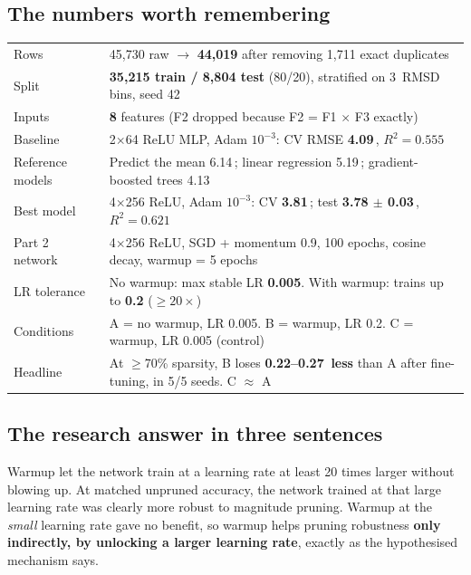 \documentclass[11pt,a4paper]{article}
\newcommand{\A}{\,\text{\AA}}
\begin{document}
\subsection*{The numbers worth remembering}
\begin{tabularx}{\linewidth}{@{}lY@{}}
\toprule
Rows & 45{,}730 raw $\to$ \textbf{44{,}019} after removing 1{,}711 exact duplicates \\
Split & \textbf{35{,}215 train / 8{,}804 test} (80/20), stratified on 3\A{} RMSD bins, seed 42 \\
Inputs & \textbf{8} features (F2 dropped because F2 = F1 $\times$ F3 exactly) \\
Baseline & 2$\times$64 ReLU MLP, Adam $10^{-3}$: CV RMSE \textbf{4.09\A}, $R^2 = 0.555$ \\
Reference models & Predict the mean 6.14\A; linear regression 5.19\A; gradient-boosted trees 4.13\A \\
Best model & 4$\times$256 ReLU, Adam $10^{-3}$: CV \textbf{3.81\A}; test \textbf{3.78 $\pm$ 0.03\A}, $R^2 = 0.621$ \\
Part 2 network & 4$\times$256 ReLU, SGD + momentum 0.9, 100 epochs, cosine decay, warmup = 5 epochs \\
LR tolerance & No warmup: max stable LR \textbf{0.005}. With warmup: trains up to \textbf{0.2} ($\geq 20\times$) \\
Conditions & A = no warmup, LR 0.005. B = warmup, LR 0.2. C = warmup, LR 0.005 (control) \\
Headline & At $\geq$70\% sparsity, B loses \textbf{0.22--0.27\A{} less} than A after fine-tuning, in 5/5 seeds. C $\approx$ A \\
\bottomrule
\end{tabularx}

\subsection*{The research answer in three sentences}
Warmup let the network train at a learning rate at least 20 times larger without blowing up. At matched unpruned
accuracy, the network trained at that large learning rate was clearly more robust to magnitude pruning. Warmup at the
\emph{small} learning rate gave no benefit, so warmup helps pruning robustness \textbf{only indirectly, by unlocking a
larger learning rate}, exactly as the hypothesised mechanism says.
\end{document}
